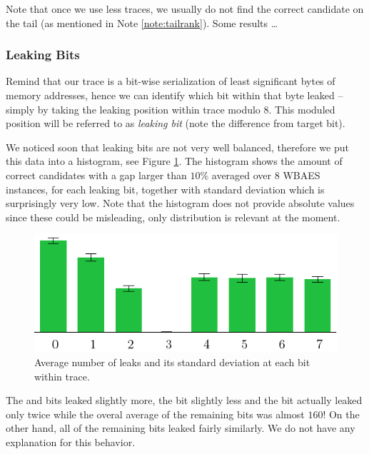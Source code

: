 	Note that once we use less traces, we usually do not find the correct candidate on the tail (as mentioned in Note \ref{note:tailrank}). Some results \ldots %

\subsubsection{Leaking Bits}
	
	Remind that our trace is a bit-wise serialization of least significant bytes of memory addresses, hence we can identify which bit within that byte leaked -- simply by taking the leaking position within trace modulo $8$. This moduled position will be referred to as {\em leaking bit} (note the difference from target bit).
	
	We noticed soon that leaking bits are not very well balanced, therefore we put this data into a histogram, see Figure \ref{fig:leakbitall}. The histogram shows the amount of correct candidates with a gap larger than $10\%$ averaged over $8$ WBAES instances, for each leaking bit, together with standard deviation which is surprisingly very low. Note that the histogram does not provide absolute values since these could be misleading, only distribution is relevant at the moment.
	
	\begin{figure}[h]
	\begin{center}
		\includegraphics{figures/leak_bit/leak_bit.pdf}
		\caption{Average number of leaks and its standard deviation at each bit within trace.}
		\label{fig:leakbitall}
	\end{center}
	\end{figure}
	
	The  and  bits leaked slightly more, the  bit slightly less and the  bit actually leaked only twice while the overal average of the remaining bits was almost $160$! On the other hand, all of the remaining bits leaked fairly similarly. We do not have any explanation for this behavior.
	
